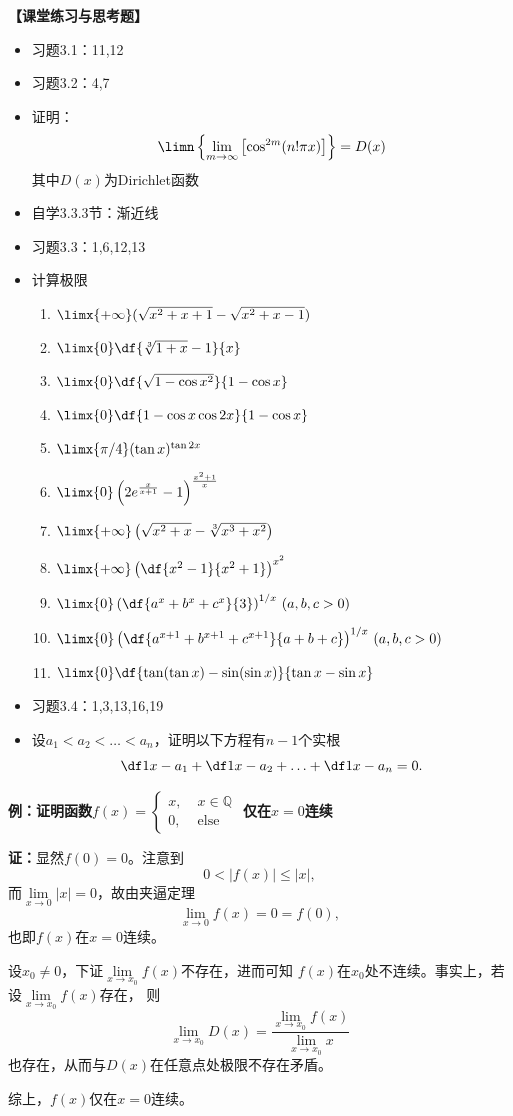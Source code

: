 {\bf 【课堂练习与思考题】}
\begin{itemize}
  \item 习题3.1：11,12
  \item 习题3.2：4,7
  \item 证明：$$\limn\left\{\lim\limits_{m\to\infty}\left[\cos^{2m}(n!\pi
	x)\right]\right\}=D(x)$$
	其中$D(x)$为Dirichlet函数
  \item 自学3.3.3节：渐近线 
  \item 习题3.3：1,6,12,13
  \item  计算极限
	\begin{enumerate}[(1)]
	  \item $\limx{+\infty}(\sqrt{x^2+x+1}-\sqrt{x^2+x-1})$ 
	  \item $\limx{0}\df{\sqrt[3]{1+x}-1}{x}$ 
	  \item $\limx{0}\df{\sqrt{1-\cos x^2}}{1-\cos x}$ 
	  \item $\limx{0}\df{1-\cos x\cos 2x}{1-\cos x}$
	  \item $\limx{\pi /4}(\tan x)^{\tan 2x}$ 
	  \item $\limx{0}\left(2e^{\frac{x}{x+1}}-1\right)^{\frac{x^2+1}{x}}$ 
	  \item $\limx{+\infty}\left(\sqrt{x^2+x}-\sqrt[3]{x^3+x^2}\right)
		$ 
	  \item $\limx{+\infty}\left(\df{x^2-1}{x^2+1}\right)^{x^2}$
	  \item $\limx{0}\left(\df{a^x+b^x+c^x}{3}\right)^{1/x}\,(a,b,c>0)$ 
	  \item $\limx{0}\left(\df{a^{x+1}+b^{x+1}+c^{x+1}}{a+b+c}\right)^{1/x}
	  \,(a,b,c>0)$ 
	  \item $\limx{0}\df{\tan(\tan x)-\sin(\sin x)}{\tan x-\sin x}$
	\end{enumerate}
  \item 习题3.4：1,3,13,16,19
  \item 设$a_1<a_2<\ldots<a_n$，证明以下方程有$n-1$个实根
	$$\df 1{x-a_1}+\df 1{x-a_2}+\ldots+\df 1{x-a_n}=0.$$
\end{itemize}

\newpage

{\Large\it

{\bf 例：证明函数$f(x)=\left\{\begin{array}{ll}
x,\;&x\in\mathbb{Q}\\ 0,\;&\mathrm{else}
\end{array}\right.$
仅在$x=0$连续}

{\bf 证：}显然$f(0)=0$。注意到
$$0<|f(x)|\leq |x|,$$
而$\lim\limits_{x\to 0}|x|=0$，故由夹逼定理
$$\lim\limits_{x\to 0}f(x)=0=f(0),$$
也即$f(x)$在$x=0$连续。

\bigskip

设$x_0\ne 0$，下证$\lim\limits_{x\to x_0}f(x)$不存在，进而可知
$f(x)$在$x_0$处不连续。事实上，若设$\lim\limits_{x\to x_0}f(x)$存在，
则
$$\lim\limits_{x\to x_0}D(x)=\frac{\lim\limits_{x\to x_0}f(x)}
{\lim\limits_{x\to x_0}x}$$
也存在，从而与$D(x)$在任意点处极限不存在矛盾。

综上，$f(x)$仅在$x=0$连续。

}